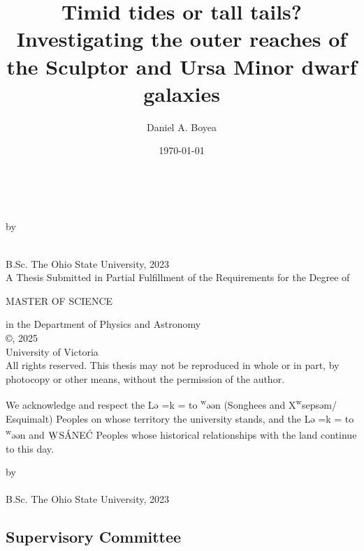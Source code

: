 \documentclass[12pt,oneside,letterpaper]{report}
\title{Timid tides or tall tails? \\
    Investigating the outer reaches of the Sculptor and Ursa Minor dwarf galaxies
}
\author{Daniel A. Boyea}
\date{\today}
\newcommand{\schwa}{ə}
\newcommand{\Lekwnen}{L\schwa{}\overcomma{k}\textsuperscript{w}\schwa{}\ng{}\schwa{}n}
\newcommand{\skipline}{\vspace{\baselineskip}}
\def\overcomma#1{%
  \setbox0=\hbox{#1}%
  \dimen0=\wd0       %
  \vbox{%
    \hbox to \dimen0{\hfil,\hfil}%
    \nointerlineskip            %
    \box0                       %
  }%
}
\begin{document}


\makeatletter
\begin{titlepage}
   \begin{center}
       \textbf{\large \@title}\\
        \skipline

        by\\
        \skipline

       \@author\\
       B.Sc. The Ohio State University, 2023\\
       \vspace*{3\baselineskip}
    A Thesis Submitted in Partial Fulfillment of the Requirements for the Degree of\\
    \skipline

    MASTER OF SCIENCE \\
    \skipline

    in the Department of Physics and Astronomy\\
       \vfill
       {\small
       ©\@author, 2025\\
       University of Victoria\\
   }
   \skipline
       {\small
       All rights reserved. This thesis may not be reproduced in whole or in part,
   by photocopy or other means, without the permission of the author.} \\
\skipline
   \end{center}
We acknowledge and respect the \Lekwnen{} (Songhees and X\textsuperscript{w}seps\schwa{}m/
Esquimalt) Peoples on whose territory the university stands, and the
\Lekwnen{} and ${\underaccent{\bar}{\rm W}}$S\'ANE\'C Peoples whose historical relationships with the
land continue to this day. 
\end{titlepage}

\addtocounter{page}{1}


\begin{centering}
\textbf{\@title}
\skipline
by\\
\skipline
\@author\\
B.Sc. The Ohio State University, 2023\\
\vspace*{3\baselineskip}
\end{centering}

\subsection*{Supervisory Committee}
\end{document}
